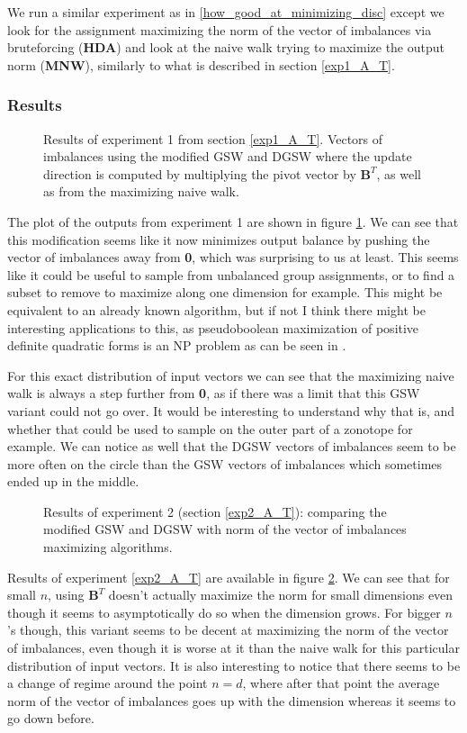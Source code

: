 \documentclass[12pt]{article}
\begin{document}
We run a similar experiment as in \ref{how_good_at_minimizing_disc} except we look for the assignment maximizing the norm of the vector of imbalances via bruteforcing (\textbf{HDA}) and look at the naive walk trying to maximize the output norm (\textbf{MNW}), similarly to what is described in section \ref{exp1_A_T}.

\subsubsection{Results}
\begin{figure}[h!]
\centering

\caption{Results of experiment 1 from section \ref{exp1_A_T}. Vectors of imbalances using the modified GSW and DGSW where the update direction is computed by multiplying the pivot vector by $\textbf{B}^T$, as well as from the maximizing naive walk.}
\label{A_T_instead_of_lstsq}
\end{figure}
The plot of the outputs from experiment 1 are shown in figure \ref{A_T_instead_of_lstsq}. We can see that this modification seems like it now minimizes output balance by pushing the vector of imbalances away from \textbf{0}, which was surprising to us at least. This seems like it could be useful to sample from unbalanced group assignments, or to find a subset to remove to maximize along one dimension for example. This might be equivalent to an already known algorithm, but if not I think there might be interesting applications to this, as pseudoboolean maximization of positive definite quadratic forms is an NP problem as can be seen in \cite{gritzmann19890}. 

For this exact distribution of input vectors we can see that the maximizing naive walk is always a step further from \textbf{0}, as if there was a limit that this GSW variant could not go over. It would be interesting to understand why that is, and whether that could be used to sample on the outer part of a zonotope for example. We can notice as well that the DGSW vectors of imbalances seem to be more often on the circle than the GSW vectors of imbalances which sometimes ended up in the middle.

\begin{figure}[h!]
\centering

\caption{Results of experiment 2 (section \ref{exp2_A_T}): comparing the modified GSW and DGSW with norm of the vector of imbalances maximizing algorithms.}
\label{A_T_instead_of_lstsq_2}
\end{figure}
Results of experiment \ref{exp2_A_T} are available in figure \ref{A_T_instead_of_lstsq_2}. We can see that for small $n$, using $\textbf{B}^T$ doesn't actually maximize the norm for small dimensions even though it seems to asymptotically do so when the dimension grows. For bigger $n$'s though, this variant seems to be decent at maximizing the norm of the vector of imbalances, even though it is worse at it than the naive walk for this particular distribution of input vectors. It is also interesting to notice that there seems to be a change of regime around the point $n=d$, where after that point the average norm of the vector of imbalances goes up with the dimension whereas it seems to go down before.
\end{document}
